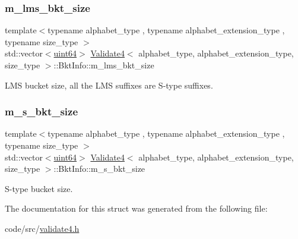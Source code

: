 \subsubsection{\texorpdfstring{m\+\_\+lms\+\_\+bkt\+\_\+size}{m\_lms\_bkt\_size}}
{\footnotesize\ttfamily template$<$typename alphabet\+\_\+type , typename alphabet\+\_\+extension\+\_\+type , typename size\+\_\+type $>$ \\
std\+::vector$<$\hyperlink{types_8h_a60e8696a4678cd348e991a1f172e53f7}{uint64}$>$ \hyperlink{class_validate4}{Validate4}$<$ alphabet\+\_\+type, alphabet\+\_\+extension\+\_\+type, size\+\_\+type $>$\+::Bkt\+Info\+::m\+\_\+lms\+\_\+bkt\+\_\+size}



L\+MS bucket size, all the L\+MS suffixes are S-\/type suffixes. 

\mbox{\label{struct_validate4_1_1_bkt_info_acf0b824764fc045b9f1ce0f1ed2863ad}} 
\subsubsection{\texorpdfstring{m\+\_\+s\+\_\+bkt\+\_\+size}{m\_s\_bkt\_size}}
{\footnotesize\ttfamily template$<$typename alphabet\+\_\+type , typename alphabet\+\_\+extension\+\_\+type , typename size\+\_\+type $>$ \\
std\+::vector$<$\hyperlink{types_8h_a60e8696a4678cd348e991a1f172e53f7}{uint64}$>$ \hyperlink{class_validate4}{Validate4}$<$ alphabet\+\_\+type, alphabet\+\_\+extension\+\_\+type, size\+\_\+type $>$\+::Bkt\+Info\+::m\+\_\+s\+\_\+bkt\+\_\+size}



S-\/type bucket size. 



The documentation for this struct was generated from the following file\+:\begin{DoxyCompactItemize}
\item 
code/src/\hyperlink{validate4_8h}{validate4.\+h}\end{DoxyCompactItemize}

